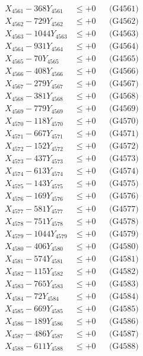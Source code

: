 \documentclass[a4paper,10pt]{article}
\begin{document}
{\begin{align}
\allowbreak
X_{4561} - 368Y_{4561} &\leq +0 && \text{(G4561)} \\
X_{4562} - 729Y_{4562} &\leq +0 && \text{(G4562)} \\
X_{4563} - 1044Y_{4563} &\leq +0 && \text{(G4563)} \\
X_{4564} - 931Y_{4564} &\leq +0 && \text{(G4564)} \\
X_{4565} - 70Y_{4565} &\leq +0 && \text{(G4565)} \\
X_{4566} - 408Y_{4566} &\leq +0 && \text{(G4566)} \\
X_{4567} - 279Y_{4567} &\leq +0 && \text{(G4567)} \\
X_{4568} - 381Y_{4568} &\leq +0 && \text{(G4568)} \\
X_{4569} - 779Y_{4569} &\leq +0 && \text{(G4569)} \\
X_{4570} - 118Y_{4570} &\leq +0 && \text{(G4570)} \\
\allowbreak
X_{4571} - 667Y_{4571} &\leq +0 && \text{(G4571)} \\
X_{4572} - 152Y_{4572} &\leq +0 && \text{(G4572)} \\
X_{4573} - 437Y_{4573} &\leq +0 && \text{(G4573)} \\
X_{4574} - 613Y_{4574} &\leq +0 && \text{(G4574)} \\
X_{4575} - 143Y_{4575} &\leq +0 && \text{(G4575)} \\
X_{4576} - 169Y_{4576} &\leq +0 && \text{(G4576)} \\
X_{4577} - 581Y_{4577} &\leq +0 && \text{(G4577)} \\
X_{4578} - 751Y_{4578} &\leq +0 && \text{(G4578)} \\
X_{4579} - 1044Y_{4579} &\leq +0 && \text{(G4579)} \\
X_{4580} - 406Y_{4580} &\leq +0 && \text{(G4580)} \\
\allowbreak
X_{4581} - 574Y_{4581} &\leq +0 && \text{(G4581)} \\
X_{4582} - 115Y_{4582} &\leq +0 && \text{(G4582)} \\
X_{4583} - 765Y_{4583} &\leq +0 && \text{(G4583)} \\
X_{4584} - 72Y_{4584} &\leq +0 && \text{(G4584)} \\
X_{4585} - 669Y_{4585} &\leq +0 && \text{(G4585)} \\
X_{4586} - 189Y_{4586} &\leq +0 && \text{(G4586)} \\
X_{4587} - 486Y_{4587} &\leq +0 && \text{(G4587)} \\
X_{4588} - 611Y_{4588} &\leq +0 && \text{(G4588)} \\

\end{align}}
\end{document}
